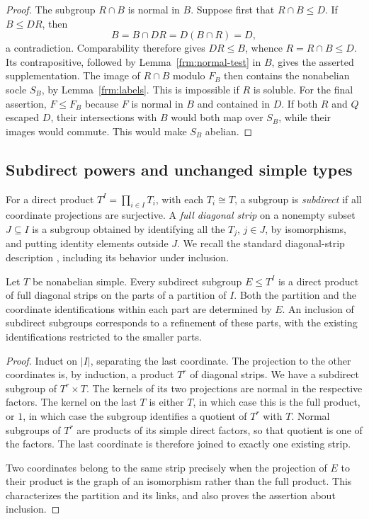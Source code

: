 \begin{proof}
The subgroup $R\cap B$ is normal in $B$. Suppose first that
$R\cap B\le D$. If $B\le DR$, then
\[
 B=B\cap DR=D(B\cap R)=D,
\]
a contradiction. Comparability therefore gives $DR\le B$, whence
$R=R\cap B\le D$. Its contrapositive, followed by
Lemma~\ref{frm:normal-test} in $B$, gives the asserted supplementation.
The image of $R\cap B$ modulo $F_B$ then contains the nonabelian
socle $S_B$, by Lemma~\ref{frm:labels}. This is impossible if $R$ is
soluble. For the final assertion, $F\le F_B$ because $F$ is normal in
$B$ and contained in $D$. If both $R$ and $Q$ escaped $D$, their
intersections with $B$ would both map over $S_B$, while their images
would commute. This would make $S_B$ abelian.
\end{proof}

\subsection{Subdirect powers and unchanged simple types}

For a direct product $T^I=\prod_{i\in I}T_i$, with each $T_i\cong T$,
a subgroup is \emph{subdirect} if all coordinate projections are
surjective. A \emph{full diagonal strip} on a nonempty subset $J\subseteq I$
is a subgroup obtained by identifying all the $T_j$, $j\in J$, by
isomorphisms, and putting identity elements outside $J$.
We recall the standard diagonal-strip description
\cite[Lemma~2.1]{PalfyTwisted}, including its behavior under inclusion.

\begin{lemma}
\label{frm:subdirect}
Let $T$ be nonabelian simple. Every subdirect subgroup $E\le T^I$
is a direct product of full diagonal strips on the parts of a partition
of $I$. Both the partition and the coordinate identifications within
each part are determined by $E$. An inclusion of subdirect subgroups
corresponds to a refinement of these parts, with the existing
identifications restricted to the smaller parts.
\end{lemma}

\begin{proof}
Induct on $|I|$, separating the last coordinate. The projection to the
other coordinates is, by induction, a product $T^r$ of diagonal strips.
We have a subdirect subgroup of $T^r\times T$. The kernels of its two
projections are normal in the respective factors. The kernel on the last
$T$ is either $T$, in which case this is the full product, or $1$, in
which case the subgroup identifies a quotient of $T^r$ with $T$.
Normal subgroups of $T^r$ are products of its simple direct factors, so
that quotient is one of the factors. The last coordinate is therefore
joined to exactly one existing strip.

Two coordinates belong to the same strip precisely when the projection
of $E$ to their product is the graph of an isomorphism rather than the
full product. This characterizes the partition and its links, and also
proves the assertion about inclusion.
\end{proof}

